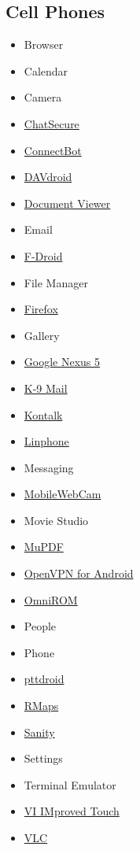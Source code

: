 \subsection{Cell Phones}
\begin{itemize}
\item Browser
\item Calendar
\item Camera
\item \href{https://chatsecure.org/}{ChatSecure}
\item \href{http://code.google.com/p/connectbot/}{ConnectBot}
\item \href{http://davdroid.bitfire.at/what-is-davdroid}{DAVdroid}
\item \href{https://github.com/dschuermann/document-viewer}{Document Viewer}
\item Email
\item \href{https://f-droid.org/}{F-Droid}
\item File Manager
\item \href{http://www.mozilla.org/en-US/firefox/}{Firefox}
\item Gallery
\item \href{https://www.google.com/nexus/5/}{Google Nexus 5}
\item \href{http://code.google.com/p/k9mail/}{K-9 Mail}
\item \href{http://kontalk.org/}{Kontalk}
\item \href{http://www.linphone.org/}{Linphone}
\item Messaging
\item \href{http://code.google.com/p/mobilewebcam-android/}{MobileWebCam}
\item Movie Studio
\item \href{http://www.mupdf.com/}{MuPDF}
\item \href{https://code.google.com/p/ics-openvpn/}{OpenVPN for Android}
\item \href{https://omnirom.org/}{OmniROM}
\item People
\item Phone
\item \href{http://code.google.com/p/pttdroid/}{pttdroid}
\item \href{http://robertdeveloper.blogspot.com/2009/08/rmaps.html}{RMaps}
\item \href{https://github.com/awaken/sanity}{Sanity}
\item Settings
\item Terminal Emulator
\item \href{https://github.com/momodalo/vimtouch}{VI IMproved Touch}
\item \href{http://www.videolan.org/vlc/download-android.html}{VLC}
\end{itemize}

